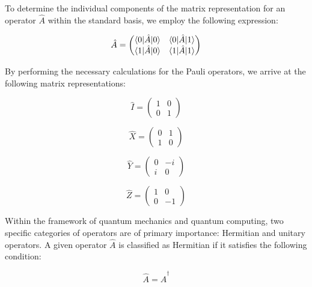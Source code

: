 \documentclass[en]{dimscthesis}
\begin{document}
To determine the individual components of the matrix representation for an operator $\hat{A}$ within the standard basis, we employ the following expression:

\begin{equation}
	\hat{A} = \begin{pmatrix} 
		\braket{0 | \hat{A} | 0} & \braket{0 | \hat{A} | 1} \\ 
		\braket{1 | \hat{A} | 0} & \braket{1 | \hat{A} | 1} 
	\end{pmatrix}
	\label{eq:matrix_rep}
\end{equation}

By performing the necessary calculations for the Pauli operators, we arrive at the following matrix representations:

\begin{equation}
	\hat{I} = \begin{pmatrix} 
		1 & 0 \\ 
		0 & 1 
	\end{pmatrix}
	\label{eq:matrix_I}
\end{equation}

\begin{equation}
	\hat{X} = \begin{pmatrix} 
		0 & 1 \\ 
		1 & 0 
	\end{pmatrix}
	\label{eq:matrix_X}
\end{equation}

\begin{equation}
	\hat{Y} = \begin{pmatrix} 
		0 & -i \\ 
		i & 0 
	\end{pmatrix}
	\label{eq:matrix_Y}
\end{equation}

\begin{equation}
	\hat{Z} = \begin{pmatrix} 
		1 & 0 \\ 
		0 & -1 
	\end{pmatrix}
	\label{eq:matrix_Z}
\end{equation}

Within the framework of quantum mechanics and quantum computing, two specific categories of operators are of primary importance: Hermitian and unitary operators. A given operator $\hat{A}$ is classified as Hermitian if it satisfies the following condition:

\begin{equation}
	\hat{A} = \hat{A}^\dagger
	\label{eq:matrix_A_dagger}
\end{equation}
\end{document}
